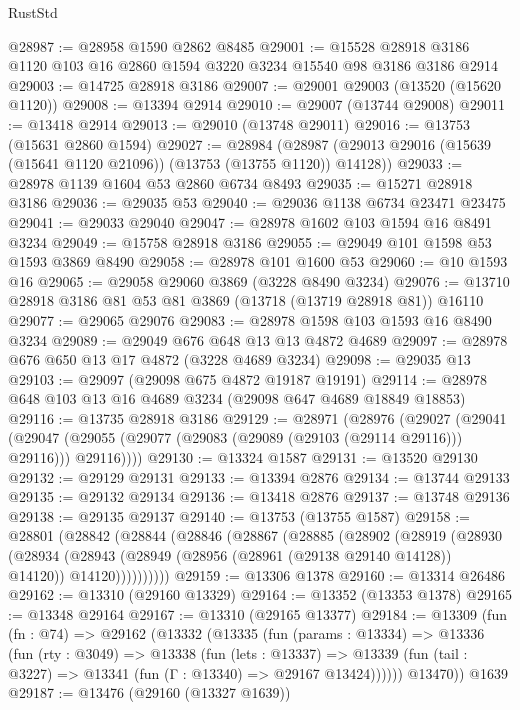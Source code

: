 \begin{lexlean}{RustStd}
\begin{coremodule}
@28987 := @28958 @1590 @2862 @8485
@29001 := @15528 @28918 @3186 @1120 @103 @16 @2860 @1594 @3220 @3234 @15540 @98 @3186 @3186 @2914
@29003 := @14725 @28918 @3186
@29007 := @29001 @29003 (@13520 (@15620 @1120))
@29008 := @13394 @2914
@29010 := @29007 (@13744 @29008)
@29011 := @13418 @2914
@29013 := @29010 (@13748 @29011)
@29016 := @13753 (@15631 @2860 @1594)
@29027 := @28984
    (@28987 (@29013 @29016 (@15639 (@15641 @1120 @21096)) (@13753 (@13755 @1120)) @14128))
@29033 := @28978 @1139 @1604 @53 @2860 @6734 @8493
@29035 := @15271 @28918 @3186
@29036 := @29035 @53
@29040 := @29036 @1138 @6734 @23471 @23475
@29041 := @29033 @29040
@29047 := @28978 @1602 @103 @1594 @16 @8491 @3234
@29049 := @15758 @28918 @3186
@29055 := @29049 @101 @1598 @53 @1593 @3869 @8490
@29058 := @28978 @101 @1600 @53
@29060 := @10 @1593 @16
@29065 := @29058 @29060 @3869 (@3228 @8490 @3234)
@29076 := @13710 @28918 @3186 @81 @53 @81 @3869 (@13718 (@13719 @28918 @81)) @16110
@29077 := @29065 @29076
@29083 := @28978 @1598 @103 @1593 @16 @8490 @3234
@29089 := @29049 @676 @648 @13 @13 @4872 @4689
@29097 := @28978 @676 @650 @13 @17 @4872 (@3228 @4689 @3234)
@29098 := @29035 @13
@29103 := @29097 (@29098 @675 @4872 @19187 @19191)
@29114 := @28978 @648 @103 @13 @16 @4689 @3234 (@29098 @647 @4689 @18849 @18853)
@29116 := @13735 @28918 @3186
@29129 := @28971
    (@28976
      (@29027
        (@29041
          (@29047 (@29055 (@29077 (@29083 (@29089 (@29103 (@29114 @29116))) @29116))) @29116))))
@29130 := @13324 @1587
@29131 := @13520 @29130
@29132 := @29129 @29131
@29133 := @13394 @2876
@29134 := @13744 @29133
@29135 := @29132 @29134
@29136 := @13418 @2876
@29137 := @13748 @29136
@29138 := @29135 @29137
@29140 := @13753 (@13755 @1587)
@29158 := @28801
    (@28842
      (@28844
        (@28846
          (@28867
            (@28885
              (@28902
                (@28919
                  (@28930
                    (@28934
                      (@28943
                        (@28949 (@28956 (@28961 (@29138 @29140 @14128)) @14120))
                        @14120))))))))))
@29159 := @13306 @1378
@29160 := @13314 @26486
@29162 := @13310 (@29160 @13329)
@29164 := @13352 (@13353 @1378)
@29165 := @13348 @29164
@29167 := @13310 (@29165 @13377)
@29184 := @13309
    (fun (fn : @74) =>
    @29162
      (@13332
        (@13335
          (fun (params : @13334) =>
          @13336
            (fun (rty : @3049) =>
            @13338
              (fun (lets : @13337) =>
              @13339 (fun (tail : @3227) => @13341 (fun (Γ : @13340) => @29167 @13424))))))
        @13470))
    @1639
@29187 := @13476 (@29160 (@13327 @1639))

\end{coremodule}
\end{lexlean}
